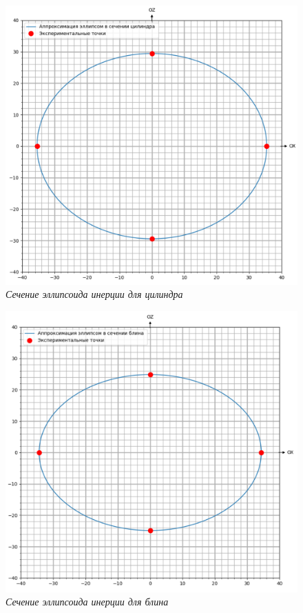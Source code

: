 \documentclass[a4paper, 12pt]{article}
\begin{document}
\begin{figure}[h!]
    \includegraphics[width=1\textwidth]{cil.png}
    \caption{\textit{Сечение эллипсоида инерции для цилиндра}}
    \label{cil-ell}
\end{figure}

\begin{figure}[h!]
    \includegraphics[width=1\textwidth]{blin.png}
    \caption{\textit{Сечение эллипсоида инерции для блина}}
    \label{blin-ell}
\end{figure}
\end{document}
